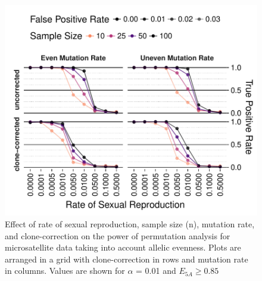\documentclass[]{article}
\theoremstyle{definition}
\theoremstyle{definition}
\theoremstyle{definition}
\theoremstyle{remark}
\begin{document}
\begin{figure}
\centering
\includegraphics[width=1.00000\textwidth]{figure/ssr_power_ea.pdf}
\caption{Effect of rate of sexual reproduction, sample size (n),
mutation rate, and clone-correction on the power of permutation analysis
for microsatellite data taking into account allelic evenness. Plots are
arranged in a grid with clone-correction in rows and mutation rate in
columns. Values are shown for \(\alpha\) = 0.01 and
\(E_{5A} \geq 0.85\)}\label{fig:sim4a}
\end{figure}
\end{document}
